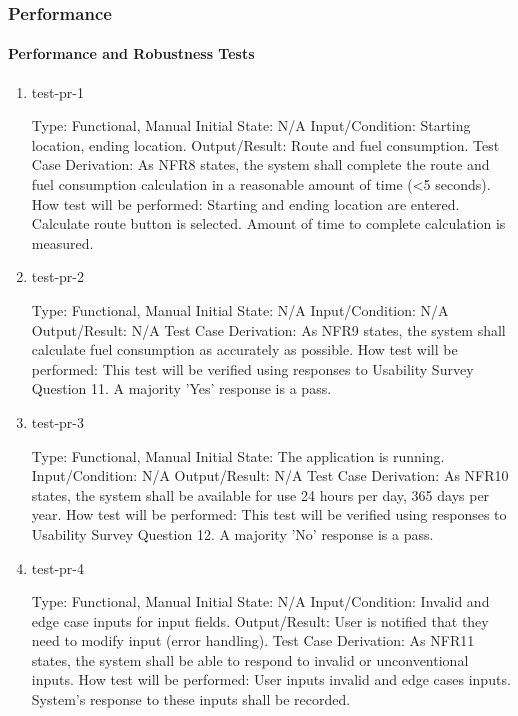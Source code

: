 \documentclass[12pt, titlepage]{article}
\begin{document}
\subsubsection{Performance}

\paragraph{Performance and Robustness Tests}

\begin{enumerate}

\item{test-pr-1\\}

Type: Functional, Manual
Initial State: N/A
Input/Condition: Starting location, ending location.
Output/Result: Route and fuel consumption.
Test Case Derivation: As NFR8 states, the system shall complete the route and fuel consumption calculation in a reasonable amount of time (<5 seconds).
How test will be performed: Starting and ending location are entered. Calculate route button is selected. Amount of time to complete calculation is measured. 

\item{test-pr-2\\}

Type: Functional, Manual
Initial State: N/A	
Input/Condition: N/A
Output/Result: N/A
Test Case Derivation: As NFR9 states, the system shall calculate fuel consumption as accurately as possible.
How test will be performed: This test will be verified using responses to Usability Survey Question 11. A majority 'Yes' response is a pass.

\item{test-pr-3\\}

Type: Functional, Manual
Initial State: The application is running. 
Input/Condition: N/A
Output/Result: N/A
Test Case Derivation: As NFR10 states, the system shall be available for use 24 hours per day, 365 days per year.
How test will be performed: This test will be verified using responses to Usability Survey Question 12. A majority 'No' response is a pass.

\item{test-pr-4\\}

Type: Functional, Manual
Initial State: N/A	
Input/Condition: Invalid and edge case inputs for input fields. 
Output/Result: User is notified that they need to modify input (error handling). 
Test Case Derivation: As NFR11 states, the system shall be able to respond to invalid or unconventional inputs.
How test will be performed: User inputs invalid and edge cases inputs. System's response to these inputs shall be recorded.


\end{enumerate}
\end{document}
